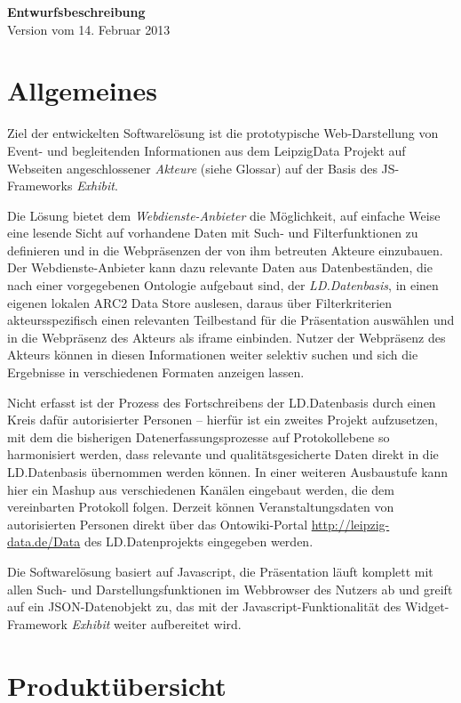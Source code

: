 \documentclass[11pt,a4paper]{article}
\begin{document}
\begin{center}
  \textbf{\Large Entwurfsbeschreibung}\\[1em]
  Version vom 14. Februar 2013
\end{center}

\section{Allgemeines}
Ziel der entwickelten Softwarelösung ist die prototypische Web-Darstellung
von Event- und begleitenden Informationen aus dem LeipzigData Projekt auf
Webseiten angeschlossener \emph{Akteure} (siehe Glossar) auf der Basis des
JS-Frameworks \emph{Exhibit}. 

Die Lösung bietet dem \emph{Webdienste-Anbieter} die Möglichkeit, auf einfache
Weise eine lesende Sicht auf vorhandene Daten mit Such- und Filterfunktionen
zu definieren und in die Webpräsenzen der von ihm betreuten Akteure
einzubauen.  Der Webdienste-Anbieter kann dazu relevante Daten aus
Datenbeständen, die nach einer vorgegebenen Ontologie aufgebaut sind, der
\emph{LD.Datenbasis}, in einen eigenen lokalen ARC2 Data Store auslesen,
daraus über Filterkriterien akteursspezifisch einen relevanten Teilbestand für
die Präsentation auswählen und in die Webpräsenz des Akteurs als iframe
einbinden.  Nutzer der Webpräsenz des Akteurs können in diesen Informationen
weiter selektiv suchen und sich die Ergebnisse in verschiedenen Formaten
anzeigen lassen.

Nicht erfasst ist der Prozess des Fortschreibens der LD.Datenbasis durch einen
Kreis dafür autorisierter Personen -- hierfür ist ein zweites Projekt
aufzusetzen, mit dem die bisherigen Datenerfassungsprozesse auf Protokollebene
so harmonisiert werden, dass relevante und qualitätsgesicherte Daten direkt in
die LD.Datenbasis übernommen werden können. In einer weiteren Ausbaustufe kann
hier ein Mashup aus verschiedenen Kanälen eingebaut werden, die dem
vereinbarten Protokoll folgen.  Derzeit können Veranstaltungsdaten von
autorisierten Personen direkt über das Ontowiki-Portal
\url{http://leipzig-data.de/Data} des LD.Datenprojekts eingegeben werden.

Die Softwarelösung basiert auf Javascript, die Präsentation läuft komplett mit
allen Such- und Darstellungsfunktionen im Webbrowser des Nutzers ab und greift
auf ein JSON-Datenobjekt zu, das mit der Javascript-Funktionalität des
Widget-Framework \emph{Exhibit} weiter aufbereitet wird.

\section{Produktübersicht}
\end{document}
